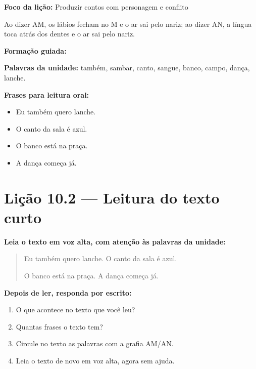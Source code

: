 \textbf{Foco da lição:} Produzir contos com personagem e conflito


\begin{boquinha}
Ao dizer AM, os lábios fecham no M e o ar sai pelo nariz; ao dizer AN, a língua toca atrás dos dentes e o ar sai pelo nariz.
\end{boquinha}

\noindent\textbf{Formação guiada:}

\begin{center}
\end{center}

\noindent\textbf{Palavras da unidade:} também, sambar, canto, sangue, banco, campo, dança, lanche.

\noindent\textbf{Frases para leitura oral:}
\begin{itemize}[leftmargin=1.6em]
  \item Eu também quero lanche.
  \item O canto da sala é azul.
  \item O banco está na praça.
  \item A dança começa já.
\end{itemize}

\section{Lição 10.2 --- Leitura do texto curto}

\noindent\textbf{Leia o texto em voz alta, com atenção às palavras da unidade:}


\begin{quote}
Eu também quero lanche. O canto da sala é azul.

O banco está na praça. A dança começa já.
\end{quote}

\textbf{Depois de ler, responda por escrito:}
\begin{enumerate}

  \item O que acontece no texto que você leu?
  \begin{center}
  \underline{\hspace{12cm}}
  \end{center}

  \item Quantas frases o texto tem?
  \begin{center}
  \underline{\hspace{12cm}}
  \end{center}

  \item Circule no texto as palavras com a grafia AM/AN.

  \item Leia o texto de novo em voz alta, agora sem ajuda.

\end{enumerate}

